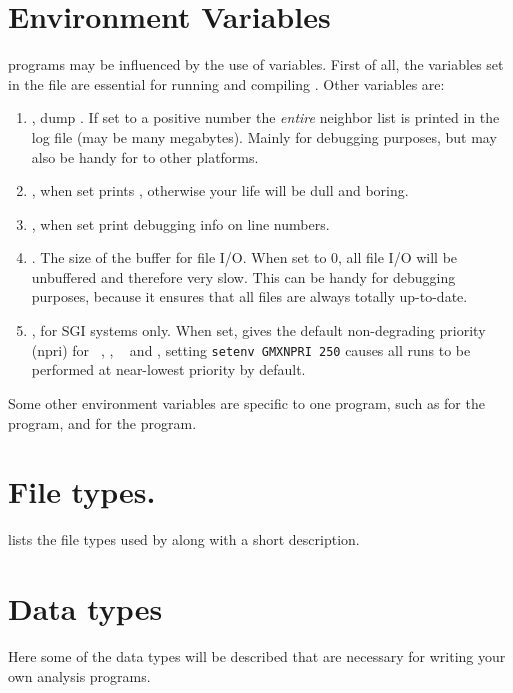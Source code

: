 \section{Environment Variables}
{\gromacs} programs may be influenced by the use of  
variables. First of all, the variables set in the  file
are essential for running and compiling {\gromacs}. Other variables are:
\begin{enumerate}
\item	{}, dump . 
	If set to a positive number the {\em entire}
	neighbor list is printed in the log file (may be many megabytes).
	Mainly for debugging purposes, but may also be handy for
	 to other platforms.
\item	{}, when set prints , otherwise
	your {\gromacs} life will be dull and boring.
\item	{}, when set print debugging info on line numbers.
\item	{}. The size of the buffer for file I/O. When set
	to 0, all file I/O will be unbuffered and therefore very slow.
	This can be handy for debugging purposes, because it ensures
	that all files are always totally up-to-date.
\item   {}, for SGI systems only. When set, gives the
	default non-degrading priority (npri) for {\tt
	}, {\tt {}}, {\tt
	} and {\tt {}},
	{\eg}\@ setting \verb'setenv GMXNPRI 250' causes all
	runs to be performed at near-lowest priority by default.
\end{enumerate}

Some other environment variables are specific to one program, such as
 for the {\tt {}} program, and
 for the {\tt {}} program.

\section{File types.}
\label{sec:fileformats}
 lists the file types used by {\gromacs} along with
a short description.


\section{Data types}
Here some of the data types will be described that are necessary for writing
your own analysis programs.

